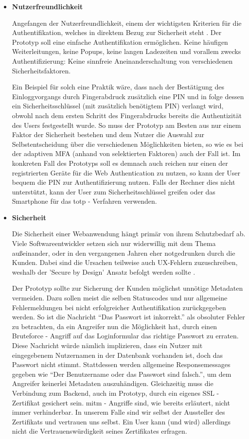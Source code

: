 \begin{itemize} 
\item \textbf{Nutzerfreundlichkeit}

Angefangen der Nutzerfreundlichkeit, einem der wichtigsten Kriterien für die Authentifikation, welches in direktem Bezug zur Sicherheit steht \cite{A24} \cite{A25} \cite{A26}. Der Prototyp soll eine einfache Authentifikation ermöglichen. Keine häufigen Weiterleitungen, keine Popups, keine langen Ladezeiten und vorallem zwecks Authentifizierung: Keine sinnfreie Aneinanderschaltung von verschiedenen Sicherheitsfaktoren.
\newpage

Ein Beispiel für solch eine Praktik wäre, dass nach der Bestätigung des Einloggvorgangs durch Fingerabdruck zusätzlich eine PIN und in folge dessen ein Sicherheitsschlüssel (mit zusätzlich benötigtem PIN) verlangt wird, obwohl nach dem ersten Schritt des Fingerabdrucks bereits die Authentizität des Users festgestellt wurde. So muss der Prototyp am Besten aus nur einem Faktor der Sicherheit bestehen und dem Nutzer die Auswahl zur Selbstentscheidung über die verschiedenen Möglichkeiten bieten, so wie es bei der adaptiven MFA (anhand von selektierten Faktoren) auch der Fall ist. Im konkreten Fall des Prototyps soll es demnach auch reichen nur einen der registrierten Geräte für die Web Authentication zu nutzen, so kann der User bequem die PIN zur Authentifizierung nutzen. Falls der Rechner dies nicht unterstützt, kann der User zum Sicherheitsschlüssel greifen oder das Smartphone für das \ac{totp} - Verfahren verwenden.

\item \textbf{Sicherheit}

Die Sicherheit einer Webanwendung hängt primär von ihrem Schutzbedarf ab. Viele Softwareentwickler setzen sich nur widerwillig mit dem Thema außeinander, oder in den vergangenen Jahren eher notgedrunken durch die Kunden. Dabei sind die Ursachen teilweise auch UX-Fehlern zuzuschreiben, weshalb der 'Secure by Design' Ansatz befolgt werden sollte \cite{A27}.

Der Prototyp sollte zur Sicherung der Kunden möglichst unnötige Metadaten vermeiden. Dazu sollen meist die selben Statuscodes und nur allgemeine Fehlermeldungen bei nicht erfolgreicher Authentifikation zurückgegeben werden. So ist die Nachricht ``Das Passwort ist inkorrekt.'' als obsoluter Fehler zu betrachten, da ein Angreifer nun die Möglichkeit hat, durch einen Bruteforce - Angriff auf das Loginformular das richtige Passwort zu erraten. Diese Nachricht würde nämlich implizieren, dass ein Nutzer mit eingegebenem Nutzernamen in der Datenbank vorhanden ist, doch das Passwort nicht stimmt. Stattdessen werden allgemeine Responsemessages gegeben wie ``Der Benutzername oder das Passwort sind falsch.'', um dem Angreifer keinerlei Metadaten auszuhändigen. Gleichzeitig muss die Verbindung zum Backend, auch im Prototyp, durch ein eigenes SSL - Zertifikat gesichert sein. \ac{mitm} - Angriffe sind, wie bereits erläutert, nicht immer verhinderbar. In unserem Falle sind wir selbst der Aussteller des Zertifikats und vertrauen uns selbst. Ein User kann (und wird) allerdings nicht die Vertrauenswürdigkeit seines Zertifikates erfragen.
\newpage


\end{itemize}
